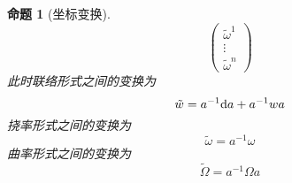 \documentclass{book}
\newtheorem{proposition}[theorem]{\indent 命题}
\newcommand{\md}{{\rm d}}
\begin{document}
\begin{proposition}[坐标变换]
\begin{equation}
                    \begin{pmatrix}
                        \tilde{\omega}^1 \\ \vdots \\ \tilde{\omega}^n
                    \end{pmatrix}
                \end{equation}
                此时联络形式之间的变换为
                \begin{equation}\label{eq:Transformation-connection-form}
                    \tilde{w} = a^{-1}\md a + a^{-1}wa
                \end{equation}
                挠率形式之间的变换为
                \begin{equation}\label{eq:Transformation-torsion-form}
                    \tilde{\omega} = a^{-1}\omega
                \end{equation}
                曲率形式之间的变换为
                \begin{equation}\label{eq:Transformation-curvature-form}
                    \tilde{\Omega} = a^{-1}\Omega a
                \end{equation}
            \end{proposition}
\end{document}
